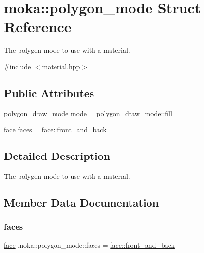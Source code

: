 \hypertarget{structmoka_1_1polygon__mode}{}\section{moka\+::polygon\+\_\+mode Struct Reference}
\label{structmoka_1_1polygon__mode}


The polygon mode to use with a material.  




{\ttfamily \#include $<$material.\+hpp$>$}

\subsection*{Public Attributes}
\begin{DoxyCompactItemize}
\item 
\mbox{\hyperlink{namespacemoka_ab11ab0363880d78783c5e5b4d5c28a8b}{polygon\+\_\+draw\+\_\+mode}} \mbox{\hyperlink{structmoka_1_1polygon__mode_aac54ec71e810b984f72b4a76f2724ba2}{mode}} = \mbox{\hyperlink{namespacemoka_ab11ab0363880d78783c5e5b4d5c28a8baa552c74784b3a82177bca6c8adde0efb}{polygon\+\_\+draw\+\_\+mode\+::fill}}
\item 
\mbox{\hyperlink{namespacemoka_a262acd665924ba4041f64f7207b17cbe}{face}} \mbox{\hyperlink{structmoka_1_1polygon__mode_a199339b9a53286c58f084d9d15de5193}{faces}} = \mbox{\hyperlink{namespacemoka_a7d65dd86af8c277bd9ebeacfd022d087ad46b3c78f91c7d43349252714bf07404}{face\+::front\+\_\+and\+\_\+back}}
\end{DoxyCompactItemize}


\subsection{Detailed Description}
The polygon mode to use with a material. 

\subsection{Member Data Documentation}
\mbox{\label{structmoka_1_1polygon__mode_a199339b9a53286c58f084d9d15de5193}} 
\subsubsection{\texorpdfstring{faces}{faces}}
{\footnotesize\ttfamily \mbox{\hyperlink{namespacemoka_a262acd665924ba4041f64f7207b17cbe}{face}} moka\+::polygon\+\_\+mode\+::faces = \mbox{\hyperlink{namespacemoka_a7d65dd86af8c277bd9ebeacfd022d087ad46b3c78f91c7d43349252714bf07404}{face\+::front\+\_\+and\+\_\+back}}}

